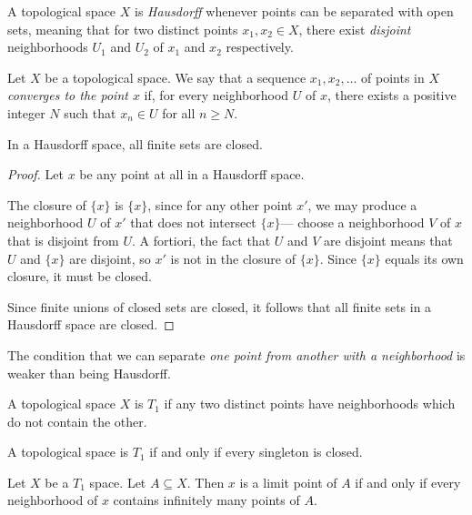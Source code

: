 \documentclass{article}
\begin{document}
\begin{definition}
    A topological space $X$ is \textit{Hausdorff} whenever points can be separated with open sets, meaning that for two distinct points $x_1, x_2 \in X$, there exist \textit{disjoint} neighborhoods $U_1$ and $U_2$ of $x_1$ and $x_2$ respectively.
\end{definition}

\begin{definition}
    Let $X$ be a topological space.
    We say that a sequence $x_1, x_2, \ldots$ of points in $X$ \textit{converges to the point $x$} if, for every neighborhood $U$ of $x$, there exists a positive integer $N$ such that $x_n \in U$ for all $n \geq N$.
\end{definition}

\begin{theorem}
    In a Hausdorff space, all finite sets are closed.
\end{theorem}

\begin{proof}
    Let $x$ be any point at all in a Hausdorff space.

    The closure of $\{x\}$ is $\{x\}$, since for any other point $x'$, we may produce a neighborhood $U$ of $x'$ that does not intersect $\{x\}$--- choose a neighborhood $V$ of $x$ that is disjoint from $U$.
    A fortiori, the fact that $U$ and $V$ are disjoint means that $U$ and $\{x\}$ are disjoint, so $x'$ is not in the closure of $\{x\}$.
    Since $\{x\}$ equals its own closure, it must be closed.

    Since finite unions of closed sets are closed, it follows that all finite sets in a Hausdorff space are closed.
\end{proof}

The condition that we can separate \textit{one point from another with a neighborhood} is weaker than being Hausdorff.

\begin{definition}
    A topological space $X$ is $T_1$ if any two distinct points have neighborhoods which do not contain the other.
\end{definition}

\begin{remark}
    A topological space is $T_1$ if and only if every singleton is closed.
\end{remark}

\begin{theorem}
    Let $X$ be a $T_1$ space.
    Let $A \subseteq X$.
    Then $x$ is a limit point of $A$ if and only if every neighborhood of $x$ contains infinitely many points of $A$.
\end{theorem}
\end{document}
